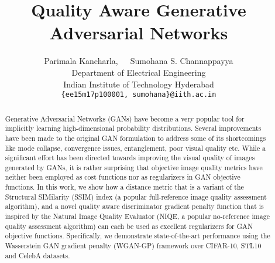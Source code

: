 \documentclass{article}
\title{Quality Aware Generative Adversarial Networks}
\author{
  Parimala Kancharla,~~~Sumohana S. Channappayya \\
  Department of Electrical Engineering\\
  Indian Institute of Technology Hyderabad\\
  \texttt{\{ee15m17p100001, sumohana\}@iith.ac.in} }
\begin{document}
\maketitle

\begin{abstract}
  Generative Adversarial Networks (GANs) have become a very popular tool for implicitly learning high-dimensional probability distributions. Several improvements have been made to the original GAN formulation to address some of its shortcomings like mode collapse, convergence issues, entanglement, poor visual quality etc. While a significant effort has been directed towards improving the visual quality of images generated by GANs, it is rather surprising that objective image quality metrics have neither been employed as cost functions nor as regularizers in GAN objective functions. In this work, we show how a distance metric that is a variant of the Structural SIMilarity (SSIM) index (a popular full-reference image quality assessment algorithm), and a novel quality aware discriminator gradient penalty function that is inspired by the Natural Image Quality Evaluator (NIQE, a popular no-reference image quality assessment algorithm) can each be used as excellent regularizers for GAN objective functions. Specifically, we demonstrate state-of-the-art performance using the Wasserstein GAN gradient penalty (WGAN-GP) framework over CIFAR-10, STL10 and CelebA datasets.
\end{abstract}
\end{document}
